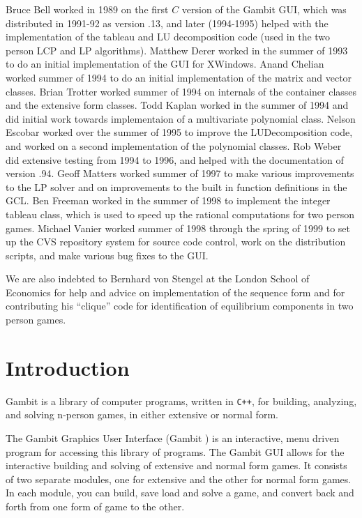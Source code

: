 Bruce Bell worked in 1989 on the first $C$ version of the Gambit GUI,
which was distributed in 1991-92 as version .13, and later (1994-1995)
helped with the implementation of the tableau and LU decomposition
code (used in the two person LCP and LP algorithms). Matthew Derer
worked in the summer of 1993 to do an initial implementation of the
GUI for XWindows.  Anand Chelian worked summer of 1994 to do an
initial implementation of the matrix and vector classes.  Brian
Trotter worked summer of 1994 on internals of the container classes
and the extensive form classes.  Todd Kaplan worked in the summer of
1994 and did initial work towards implementaion of a multivariate
polynomial class.  Nelson Escobar worked over the summer of 1995 to
improve the LUDecomposition code, and worked on a second
implementation of the polynomial classes.  Rob Weber did extensive
testing from 1994 to 1996, and helped with the documentation of
version .94.  Geoff Matters worked summer of 1997 to make various
improvements to the LP solver and on improvements to the built in
function definitions in the GCL.  Ben Freeman worked in the summer of
1998 to implement the integer tableau class, which is used to speed up
the rational computations for two person games.  Michael Vanier worked
summer of 1998 through the spring of 1999 to set up the CVS repository
system for source code control, work on the distribution scripts, and
make various bug fixes to the GUI.

We are also indebted to Bernhard von Stengel at the London School of
Economics for help and advice on implementation of the sequence form
and for contributing his ``clique'' code for identification of
equilibrium components in two person games.

\chapter{Introduction}

Gambit is a library of computer programs, written
in \verb$C++$, for building, analyzing, and solving n-person games, in
either extensive or normal form.

The Gambit Graphics User Interface (Gambit ) is an
interactive, menu driven program for accessing this library of programs.
The Gambit GUI allows for the interactive building and solving of
extensive and normal form games.  It consists of two separate modules, one
for extensive and the other for normal form games.   In each module, you
can build, save load and solve a game, and convert back and forth from one
form of game to the other.

